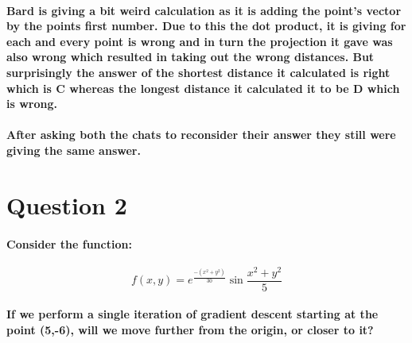 \documentclass[11pt]{article} %
\begin{document}
\paragraph{\textbf{Bard} is giving a bit weird calculation as it is adding the point’s vector by the points first
    number. Due to this the dot product, it is giving for each and every point is wrong and in
    turn the projection it gave was also wrong which resulted in taking out the wrong distances.
    But surprisingly the answer of the shortest distance it calculated is right which is C whereas
    the longest distance it calculated it to be D which is wrong.}

\paragraph{After asking both the chats to reconsider their answer they still were giving the same answer.}


% 
% 
% 
% 
% 
% 
% 
% 
% 
% 
% 
% 
% 
% 
% 
% 
% 
% 
% 
% 
% 
% 
% 
% 
% 
% 
% 
% 
\newpage
\section{Question 2}
\paragraph{Consider the function: }
$$ f(x,y)=e^{\frac{-(x^2+y^2)}{30}} \sin \frac{x^2+y^2}{5} $$
\paragraph{If we perform a single iteration of gradient descent starting at the point (5,-6), will we move further from the origin, or closer to it?}
% 
% 
% 
% 
% 
% 
% 
% 
% 
% 
\end{document}
